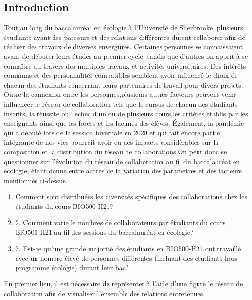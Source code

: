 \documentclass[12pt]{article}
\begin{document}
\begin{multicols}{2}
\section{Introduction}
Tout au long du baccalauréat en écologie à l’Université de Sherbrooke, plusieurs étudiants ayant des parcours et des relations différentes durent collaborer afin de réaliser des travaux de diverses envergures. Certaines personnes se connaissaient avant de débuter leurs études au premier cycle, tandis que d’autres on apprit à se connaître au travers des multiples travaux et activités universitaires. Des intérêts communs et des personnalités compatibles semblent avoir influencé le choix de chacun des étudiants concernant leurs partenaires de travail pour divers projets. Outre la connexion entre les personnes,plusieurs autres facteurs peuvent venir influencer le réseau de collaboration tels que le cursus de chacun des étudiants inscrits, la réussite ou l’échec d’un ou de plusieurs cours,les critères établis par les enseignants ainsi que les forces et les lacunes des élèves. Également, la pandémie qui a débuté lors de la session hivernale en 2020 et qui fait encore partie intégrante de nos vies pourrait avoir eu des impacts considérables sur la composition et la distribution du réseau de collaborations.On peut donc se questionner sur l’évolution du réseau de collaboration au fil du baccalauréat en écologie, étant donné entre autres de la variation des paramètres et des facteurs mentionnés ci-dessus.
\begin{enumerate}
    \item {Comment sont distribuées les diversités spécifiques des collaborations chez les étudiants du cours BIO500-H21?}
    \item {2. Comment varie le nombres de collaborateurs par étudiants du cours BiO500-H21 au fil des sessions du baccalauréat en écologie?}
    \item {3. Est-ce qu’une grande majorité des étudiants en BIO500-H21 ont travaillé avec un nombre élevé de personnes différentes (incluant des étudiants hors programme écologie) durant leur bac?}
    \end{enumerate}
En premier lieu, il est nécessaire de représenter à l’aide d’une figure le réseau de collaboration afin de visualiser l’ensemble des relations entretenues.

\end{multicols}
\end{document}
